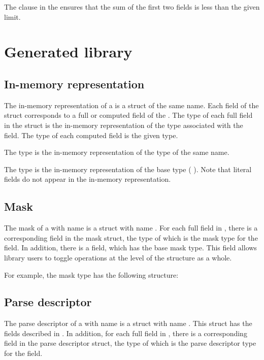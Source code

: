 The \Pwhere{} clause in the  \Pstruct{} ensures
that the sum of the first two fields is less than the given limit.


\section{Generated library}
\subsection{In-memory representation}
\label{sec:structs-rep}
The in-memory representation of a \Pstruct{} is a \C{} struct of the
same name.  Each field of the \C{} struct corresponds to a full or
computed field of the \Pstruct{}.  The type of each full field in
the \C{} struct is the in-memory representation of the \PADSL{} type
associated with the field.  The type of each computed field is 
the given \C{} type. 

The \C{} type  is the in-memory representation of
the \PADSL{} type of the same name.

%
\noindent
The type  is the in-memory representation of the base
type  (\cf{} ).  Note that literal fields
do not appear in the in-memory representation. 

\subsection{Mask}
\label{sec:structs-masks}
The mask of a \Pstruct{} with name  is a \C{} struct 
with name .  For each full field in
, there is a corresponding field in the mask struct, the
type of which is the mask type for
the field.  In addition, there is a 
 field, which has the base mask type.  This field allows
library users to toggle operations at the level of the structure as a
whole. 

For example, the mask type  has the
following structure:


\subsection{Parse descriptor}
\label{sec:structs-parse-descriptors}
The parse descriptor of a \Pstruct{} with name  is a \C{}
struct with name .  This struct has the fields
described in . In addition, for
each full field in , there is a corresponding field in
the parse descriptor struct, the type of which is the parse descriptor
type for the field.

